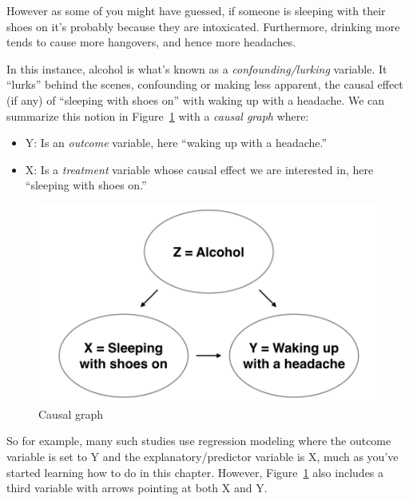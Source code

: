 \documentclass[
  letterpaper,
  DIV=11,
  numbers=noendperiod]{scrreprt}
\providecommand{\tightlist}{%
  \setlength{\itemsep}{0pt}\setlength{\parskip}{0pt}}\usepackage{longtable,booktabs,array}
\theoremstyle{definition}
\theoremstyle{remark}
\begin{document}
However as some of you might have guessed, if someone is sleeping with
their shoes on it's probably because they are intoxicated. Furthermore,
drinking more tends to cause more hangovers, and hence more headaches.

In this instance, alcohol is what's known as a
\emph{confounding/lurking} variable. It ``lurks'' behind the scenes,
confounding or making less apparent, the causal effect (if any) of
``sleeping with shoes on'' with waking up with a headache. We can
summarize this notion in Figure~\ref{fig-moderndive-figure-causal-graph}
with a \emph{causal graph} where:

\begin{itemize}
\tightlist
\item
  Y: Is an \emph{outcome} variable, here ``waking up with a headache.''
\item
  X: Is a \emph{treatment} variable whose causal effect we are
  interested in, here ``sleeping with shoes on.''
\end{itemize}

\begin{figure}

{\centering \includegraphics{images/flowcharts/flowchart.009-cropped.png}

}

\caption{\label{fig-moderndive-figure-causal-graph}Causal graph}

\end{figure}

So for example, many such studies use regression modeling where the
outcome variable is set to Y and the explanatory/predictor variable is
X, much as you've started learning how to do in this chapter. However,
Figure~\ref{fig-moderndive-figure-causal-graph} also includes a third
variable with arrows pointing at both X and Y.
\end{document}
